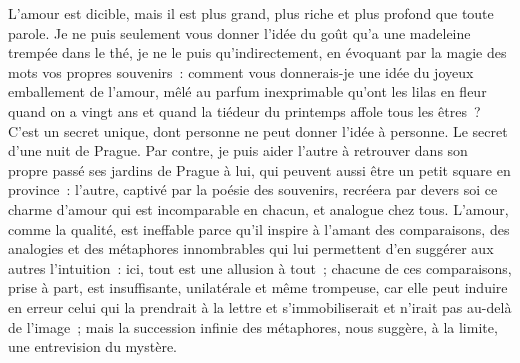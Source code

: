 
{L'amour est dicible, mais il est plus grand, plus riche et plus
profond que toute parole. Je ne puis seulement vous donner l'idée du
goût qu'a une madeleine trempée dans le thé, je ne le puis
qu'indirectement, en évoquant par la magie des mots vos propres
souvenirs~: comment vous donnerais-je une idée du joyeux emballement
de l'amour, mêlé au parfum inexprimable qu'ont les lilas en fleur
quand on a vingt ans et quand la tiédeur du printemps affole tous les
êtres~? C'est un secret unique, dont personne ne peut donner l'idée à
personne. Le secret d'une nuit de Prague. Par contre, je puis aider
l'autre à retrouver dans son propre passé ses jardins de Prague à
lui, qui peuvent aussi être un petit square en province~: l'autre,
captivé par la poésie des souvenirs, recréera par devers soi ce
charme d'amour qui est incomparable en chacun, et analogue chez tous.
L'amour, comme la qualité, est ineffable parce qu'il inspire à
l'amant des comparaisons, des analogies et des métaphores
innombrables qui lui permettent d'en suggérer aux autres l'intuition~: ici, tout est une allusion à tout~; chacune de ces comparaisons,
prise à part, est insuffisante, unilatérale et même trompeuse, car
elle peut induire en erreur celui qui la prendrait à la lettre et
s'immobiliserait et n'irait pas au-delà de l'image~; mais la
succession infinie des métaphores, nous suggère, à la limite, une
entrevision du mystère.
}

